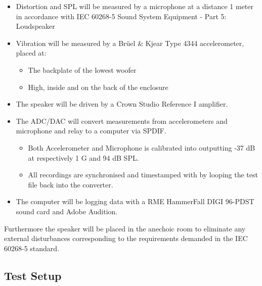\begin{itemize}
\item Distortion and \gls{SPL} will be measured by a microphone at a distance 1 meter in accordance with IEC 60268-5 Sound System Equipment - Part 5: Loudspeaker
\item Vibration will be measured by a Brüel \& Kjear Type 4344 accelerometer, placed at:
\begin{itemize}
\item The backplate of the lowest woofer
\item High, inside and on the back of the enclosure 
\end{itemize}
\item The speaker will be driven by a Crown Studio Reference I amplifier.
\item The ADC/DAC will convert measurements from accelerometers and microphone and relay to a computer via SPDIF.
\begin{itemize}
\item Both Accelerometer and Microphone is calibrated into outputting -37 dB at respectively 1 G and 94 dB \gls{SPL}.
\item All recordings are synchronised and timestamped with by looping the test file back into the converter.
\end{itemize}
\item The computer will be logging data with a RME HammerFall DIGI 96-PDST sound card and Adobe Audition.
\end{itemize}

Furthermore the speaker will be placed in the anechoic room to eliminate any external disturbances corresponding to the requirements demanded in the 
IEC 60268-5 standard.

\subsection*{Test Setup}

%

